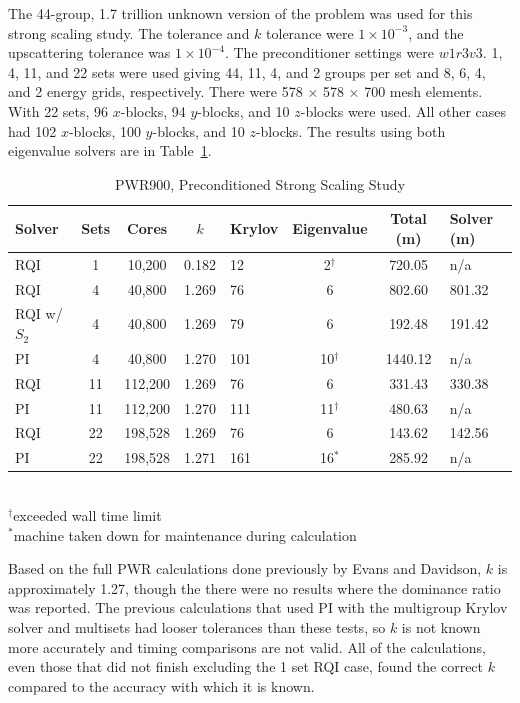 The 44-group, 1.7 trillion unknown version of the problem was used for this strong scaling study. The tolerance and $k$ tolerance were $1 \times 10^{-3}$, and the upscattering tolerance was $1 \times 10^{-4}$. The preconditioner settings were $w1r3v3$. 1, 4, 11, and 22 sets were used giving 44, 11, 4, and 2 groups per set and 8, 6, 4, and 2 energy grids, respectively. There were 578 $\times$ 578 $\times$ 700 mesh elements. With 22 sets, 96 $x$-blocks, 94 $y$-blocks, and 10 $z$-blocks were used. All other cases had 102 $x$-blocks, 100 $y$-blocks, and 10 $z$-blocks. The results using both eigenvalue solvers are in Table~\ref{table:full PWR}. 
%
\begin{table}[!h]
\caption{PWR900, Preconditioned Strong Scaling Study}
\begin{center}
\begin{tabular}{| l | c | c | c | l | c | c | l |}
\hline
Solver & Sets & Cores & $k$ & Krylov & Eigenvalue & Total (m) & Solver (m)\\[0.5ex]
\hline
RQI & 1   & 10,200   & 0.182 & 12    & 2$^{\dag}$ & 720.05    & n/a \\
RQI & 4   & 40,800   & 1.269 & 76   &  6               & 802.60   & 801.32 \\
RQI w/ $S_{2}$ & 4   & 40,800   & 1.269 & 79   &  6               & 192.48   & 191.42 \\
PI    & 4   & 40,800   & 1.270 & 101 & 10$^{\dag}$ & 1440.12 & n/a \\
RQI & 11 & 112,200 & 1.269 & 76   & 6                & 331.43    & 330.38 \\
PI    & 11 & 112,200 & 1.270 & 111 & 11$^{\dag}$ & 480.63    & n/a \\
RQI & 22 & 198,528 & 1.269 & 76   & 6                & 143.62    & 142.56 \\
PI    & 22 & 198,528 & 1.271 & 161 & 16$^{*}$      & 285.92    & n/a \\
\hline 
\end{tabular}\\
$^{\dag}$exceeded wall time limit \\ 
$^{*}$machine taken down for maintenance during calculation
\end{center}
\label{table:full PWR}
\end{table}  

Based on the full PWR calculations done previously by Evans and Davidson, $k$ is approximately 1.27, though the there were no results where the dominance ratio was reported. The previous calculations that used PI with the multigroup Krylov solver and multisets had looser tolerances than these tests, so $k$ is not known more accurately and timing comparisons are not valid. All of the calculations, even those that did not finish excluding the 1 set RQI case, found the correct $k$ compared to the accuracy with which it is known. 

